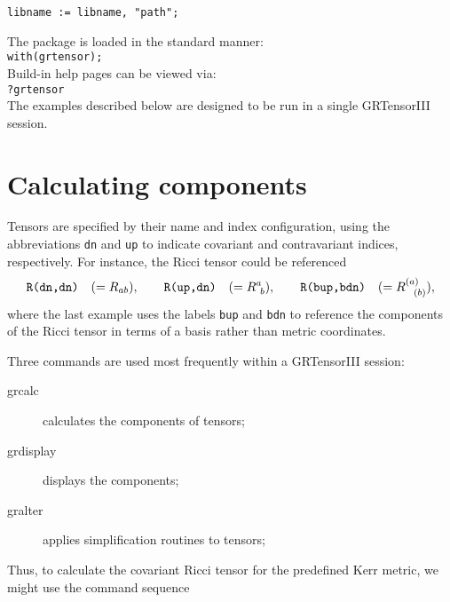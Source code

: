 \documentclass{article}
\begin{document}
\noindent\texttt{libname := libname, "path";}

The package is loaded in the standard manner:\\

\noindent\texttt{with(grtensor);}\\

Build-in help pages can be viewed via:\\

\noindent\texttt{?grtensor}\\

The examples described below are designed to be run in a single
GRTensorIII session.
\section{Calculating components}
Tensors are specified by their name and index configuration, using the
abbreviations {\tt dn} and {\tt up} to indicate covariant and
contravariant indices, respectively. For instance, the Ricci tensor
could be referenced
\[
  \text{\tt R(dn,dn)}\quad (= R_{ab}),\qquad
  \text{\tt R(up,dn)}\quad (= R^a_{\ b}), \qquad
  \text{\tt R(bup,bdn)}\quad (= R^{(a)}_{\ \ (b)}),
\]
where the last example uses the labels {\tt bup} and {\tt bdn} to
reference the components of the Ricci tensor in terms of a basis
rather than metric coordinates.

Three commands are used most frequently within a GRTensorIII session:
\begin{description}
  \item[grcalc] calculates the components of tensors;
  \item[grdisplay] displays the components;
  \item[gralter] applies simplification routines to tensors;
\end{description}
Thus, to calculate the covariant Ricci tensor for the predefined Kerr metric,
we might use the command sequence\\
\end{document}
